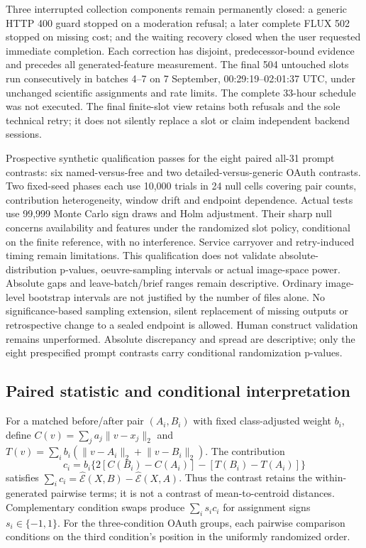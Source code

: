 \documentclass[11pt]{article}
\begin{document}
Three interrupted collection components remain permanently closed: a generic
HTTP 400 guard stopped on a moderation refusal; a later complete FLUX 502 stopped
on missing cost; and the waiting recovery closed when the user requested immediate
completion. Each correction has disjoint, predecessor-bound evidence and precedes
all generated-feature measurement. The final 504 untouched slots run consecutively
in batches 4--7 on 7 September, 00:29:19--02:01:37 UTC, under unchanged scientific
assignments and rate limits. The complete 33-hour schedule was not executed.
The final finite-slot view retains both refusals and the sole technical retry;
it does not silently replace a slot or claim independent backend sessions.

Prospective synthetic qualification passes for the eight paired all-31 prompt
contrasts: six named-versus-free and two detailed-versus-generic OAuth contrasts.
Two fixed-seed phases each use 10,000 trials in 24 null cells covering pair counts,
contribution heterogeneity, window drift and endpoint dependence. Actual tests use
99,999 Monte Carlo sign draws and Holm adjustment. Their sharp null concerns
availability and features under the randomized slot policy, conditional on the
finite reference, with no interference. Service carryover and retry-induced timing
remain limitations. This qualification does not validate absolute-distribution
p-values, oeuvre-sampling intervals or actual image-space power. Absolute gaps and
leave-batch/brief ranges remain descriptive. Ordinary image-level bootstrap
intervals are not justified by the number of files alone.
No significance-based sampling extension, silent replacement of missing outputs
or retrospective change to a sealed endpoint is allowed. Human construct validation remains unperformed. Absolute discrepancy and spread
are descriptive; only the eight prespecified prompt contrasts carry conditional
randomization p-values.

\subsection{Paired statistic and conditional interpretation}
For a matched before/after pair $(A_i,B_i)$ with fixed class-adjusted weight
$b_i$, define $C(v)=\sum_j a_j\lVert v-x_j\rVert_2$ and
$T(v)=\sum_i b_i(\lVert v-A_i\rVert_2+\lVert v-B_i\rVert_2)$. The contribution
\begin{equation}
 c_i=b_i\{2[C(B_i)-C(A_i)]-[T(B_i)-T(A_i)]\}
\end{equation}
satisfies $\sum_i c_i=\widehat{\mathcal E}(X,B)-\widehat{\mathcal E}(X,A)$.
Thus the contrast retains the within-generated pairwise terms; it is not a
contrast of mean-to-centroid distances. Complementary condition swaps produce
$\sum_i s_i c_i$ for assignment signs $s_i\in\{-1,1\}$. For the three-condition
OAuth groups, each pairwise comparison conditions on the third condition's
position in the uniformly randomized order.
\end{document}
